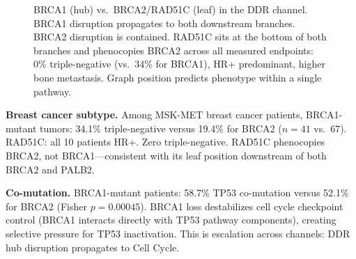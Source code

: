 \documentclass[11pt]{article}
\begin{document}
\begin{figure}[ht]
\centering
{}
\caption{BRCA1 (hub) vs.\ BRCA2/RAD51C (leaf) in the DDR channel.
BRCA1 disruption propagates to both downstream branches.
BRCA2 disruption is contained. RAD51C sits at the bottom of
both branches and phenocopies BRCA2 across all measured
endpoints: 0\% triple-negative (vs.\ 34\% for BRCA1),
HR+ predominant, higher bone metastasis. Graph position
predicts phenotype within a single pathway.}
\label{fig:brca}
\end{figure}

\textbf{Breast cancer subtype.}
Among MSK-MET breast cancer patients, BRCA1-mutant tumors: 34.1\%
triple-negative versus 19.4\% for BRCA2 ($n = 41$ vs.\ $67$).
RAD51C: all 10 patients HR+. Zero triple-negative. RAD51C
phenocopies BRCA2, not BRCA1---consistent with its leaf position
downstream of both BRCA2 and PALB2.

\textbf{Co-mutation.}
BRCA1-mutant patients: 58.7\% TP53 co-mutation versus 52.1\% for
BRCA2 (Fisher $p = 0.00045$). BRCA1 loss destabilizes cell cycle
checkpoint control (BRCA1 interacts directly with TP53 pathway
components), creating selective pressure for TP53 inactivation.
This is escalation across channels: DDR hub disruption propagates
to Cell Cycle.
\end{document}
